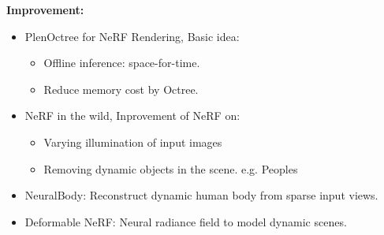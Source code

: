 \textbf{Improvement: } 
\begin{itemize}
    \item PlenOctree for NeRF Rendering, Basic idea: 
    \begin{itemize}
        \item Offline inference: space-for-time. 
        \item Reduce memory cost by Octree. 
    \end{itemize}
    \item NeRF in the wild, Inprovement of NeRF on:
    \begin{itemize}
        \item Varying illumination of input images
        \item Removing dynamic objects in the scene. e.g. Peoples
    \end{itemize}
    \item NeuralBody: Reconstruct dynamic human body from sparse input views. 
    \item Deformable NeRF: Neural radiance field to model dynamic scenes. 
\end{itemize}
